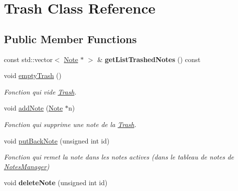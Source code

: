 \hypertarget{class_trash}{}\section{Trash Class Reference}
\label{class_trash}
\subsection*{Public Member Functions}
\begin{DoxyCompactItemize}
\item 
\mbox{\label{class_trash_a95c0683c6b1caebb3ab566a533a90876}} 
const std\+::vector$<$ \hyperlink{class_note}{Note} $\ast$ $>$ \& {\bfseries get\+List\+Trashed\+Notes} () const
\item 
\mbox{\label{class_trash_ad2ae17877be5f9740176ee54f99704c7}} 
void \hyperlink{class_trash_ad2ae17877be5f9740176ee54f99704c7}{empty\+Trash} ()
\begin{DoxyCompactList}\small\item\em Fonction qui vide \hyperlink{class_trash}{Trash}. \end{DoxyCompactList}\item 
void \hyperlink{class_trash_a938c113450a14db9ff01d5747723f073}{add\+Note} (\hyperlink{class_note}{Note} $\ast$n)
\begin{DoxyCompactList}\small\item\em Fonction qui supprime une note de la \hyperlink{class_trash}{Trash}. \end{DoxyCompactList}\item 
void \hyperlink{class_trash_aab5b97637ce7706c0818261bfbdcbd05}{put\+Back\+Note} (unsigned int id)
\begin{DoxyCompactList}\small\item\em Fonction qui remet la note dans les notes actives (dans le tableau de notes de \hyperlink{class_notes_manager}{Notes\+Manager}) \end{DoxyCompactList}\item 
\mbox{\label{class_trash_a65e68f34236ec1994a96292870ab8515}} 
void {\bfseries delete\+Note} (unsigned int id)
\end{DoxyCompactItemize}
